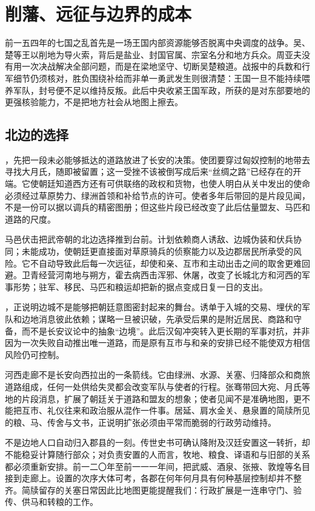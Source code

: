 \section{削藩、远征与边界的成本}
\label{sec:han-frontier-expansion}

前一五四年的七国之乱首先是一场王国内部资源能够否脱离中央调度的战争。吴、楚等王以削地为导火索，背后是盐业、封国官属、宗室名分和地方兵众。周亚夫没有用一次决战解决全部问题，而是在梁地坚守、切断吴楚粮道。战报中的兵数和行军细节仍须核对，胜负围绕补给而非单一勇武发生则很清楚：王国一旦不能持续喂养军队，封号便不足以维持反叛。此后中央收紧王国军政，所获的是对东部要地的更强核验能力，不是把地方社会从地图上擦去。

\subsection{北边的选择}

，先把一段未必能够抵达的道路放进了长安的决策。使团要穿过匈奴控制的地带去寻找大月氏，随即被留置；这一受挫不该被倒写成后来“丝绸之路”已经存在的开端。它使朝廷知道西方还有可供联络的政权和货物，也使人明白从关中发出的使命必须经过草原势力、绿洲首领和补给节点的许可。使者多年后带回的是片段见闻，不是一份可以据以调兵的精密图册；但这些片段已经改变了此后估量盟友、马匹和道路的尺度。

马邑伏击把武帝朝的北边选择推到台前。计划依赖商人诱敌、边城伪装和伏兵协同；未能成功，使朝廷更直接面对草原骑兵的侦察能力以及边郡居民所承受的风险。它不自动导致此后每一次远征，却使和亲、互市和主动出击之间的取舍更难回避。卫青经营河南地与朔方，霍去病西击浑邪、休屠，改变了长城北方和河西的军事形势；驻军、移民、马匹和粮运却把新的据点变成日复一日的支出。

，正说明边城不是能够把朝廷意图密封起来的舞台。诱单于入城的交易、埋伏的军队和边地消息彼此依赖；谋略一旦被识破，先承受后果的是附近居民、商路和守备，而不是长安议论中的抽象“边境”。此后汉匈冲突转入更长期的军事对抗，并非因为一次失败自动推出唯一道路，而是原有互市与和亲的安排已经不能使双方相信风险仍可控制。

河西走廊不是长安向西拉出的一条箭线。它由绿洲、水源、关塞、归降部众和商旅道路组成，任何一处供给失灵都会改变军队与使者的行程。张骞带回大宛、月氏等地的片段消息，扩展了朝廷关于道路和盟友的想象；使者见闻不是准确地图，更不能把互市、礼仪往来和政治服从混作一件事。居延、肩水金关、悬泉置的简牍所见的粮、马、传舍与文书，正说明扩张必须由平常而脆弱的行政劳动维持。

不是边地人口自动归入郡县的一刻。传世史书可确认降附及汉廷安置这一转折，却不能稳妥计算随行部众；对负责安置的人而言，牧地、粮食、译语和与旧部的关系都必须重新安排。前一二〇年至前一一一年间，把武威、酒泉、张掖、敦煌等名目接到走廊上。设置的次序大体可考，各郡在何年何月具有何种基层控制却并不整齐。简牍留存的关塞日常因此比地图更能提醒我们：行政扩展是一连串守门、验传、供马和转粮的工作。

